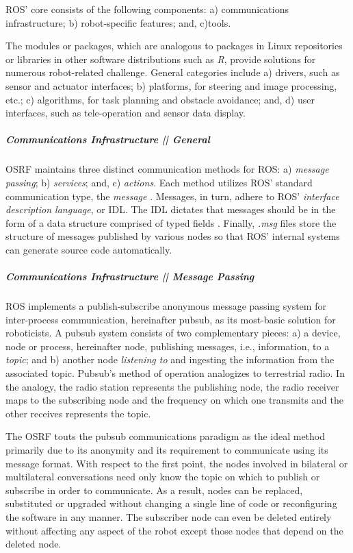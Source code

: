 \documentclass[9pt,twocolumn,twoside]{styles/osajnl}
\begin{document}
ROS' core consists of the following components: a) communications infrastructure; b) robot-specific features; and, c)tools.  

The modules or packages, which are analogous to packages in Linux repositories or libraries in other software distributions such as \textit{R}, provide solutions for numerous robot-related challenge.  General categories include a) drivers, such as sensor and actuator interfaces; b) platforms, for steering and image processing, etc.; c) algorithms, for task planning and obstacle avoidance; and, d) user interfaces, such as tele-operation and sensor data display. \cite{www-software-categories}

\subparagraph{Communications Infrastructure || General}
OSRF maintains three distinct communication methods for ROS: a) \textit{message passing}; b) \textit{services}; and, c) \textit{actions}.  Each method utilizes ROS' standard communication type, the \textit{message} \cite{www-ros-core-components}.  Messages, in turn, adhere to ROS' \textit{interface description language}, or IDL. The IDL dictates that messages should be in the form of a data structure comprised of typed fields \cite{www-ros-messages}. Finally, \textit{.msg} files store the structure of messages published by various nodes so that ROS' internal systems can generate source code automatically.

\subparagraph{Communications Infrastructure || Message Passing}
ROS implements a publish-subscribe anonymous message passing system for inter-process communication, hereinafter pubsub, as its most-basic solution for roboticists.  A pubsub system consists of two complementary pieces: a) a device, node or process, hereinafter node, publishing messages, i.e., information, to a \textit{topic}; and b) another node \textit{listening to} and ingesting the information from the associated topic.  Pubsub's method of operation analogizes to terrestrial radio.  In the analogy, the radio station represents the publishing node, the radio receiver maps to the subscribing node and the frequency on which one transmits and the other receives represents the topic.  

The OSRF touts the pubsub communications paradigm as the ideal method  primarily due to its anonymity and its requirement to communicate using its message format.  With respect to the first point, the nodes involved in bilateral or multilateral conversations need only know the topic on which to publish or subscribe in order to communicate.  As a result, nodes can be replaced, substituted or upgraded without changing a single line of code or reconfiguring the software in any manner.  The subscriber node can even be deleted entirely without affecting any aspect of the robot except those nodes that depend on the deleted node.
\end{document}
